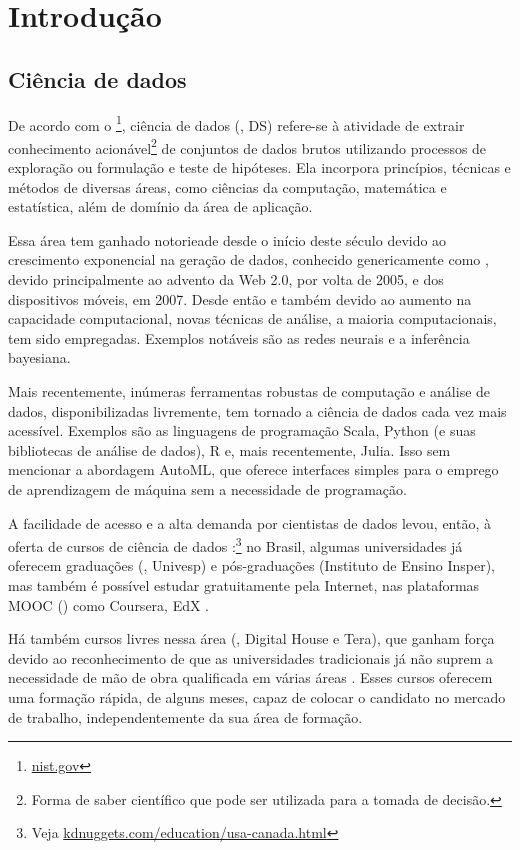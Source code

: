\section{Introdução}
\subsection{Ciência de dados}

De acordo com o \footnote{\url{nist.gov}}, ciência de dados (, DS) refere-se à atividade de extrair conhecimento acionável\footnote{Forma de saber científico que pode ser utilizada para a tomada de decisão.} de conjuntos de dados brutos utilizando processos de exploração ou formulação e teste de hipóteses.
Ela incorpora princípios, técnicas e métodos de diversas áreas, como ciências da computação, matemática e estatística, além de domínio da área de aplicação.

Essa área tem ganhado notorieade desde o início deste século devido ao crescimento exponencial na geração de dados, conhecido genericamente como , devido principalmente ao advento da Web 2.0, por volta de 2005, e dos dispositivos móveis, em 2007.
Desde então e também devido ao aumento na capacidade computacional, novas técnicas de análise, a maioria computacionais, tem sido empregadas.
Exemplos notáveis são as redes neurais e a inferência bayesiana.

Mais recentemente, inúmeras ferramentas robustas de computação e análise de dados, disponibilizadas livremente, tem tornado a ciência de dados cada vez mais acessível.
Exemplos são as linguagens de programação Scala, Python (e suas bibliotecas de análise de dados), R e, mais recentemente, Julia.
Isso sem mencionar a abordagem AutoML, que oferece interfaces simples para o emprego de aprendizagem de máquina sem a necessidade de programação.

A facilidade de acesso e a alta demanda por cientistas de dados levou, então, à oferta de cursos de ciência de dados \cite{Hassan2019}:\footnote{Veja \url{kdnuggets.com/education/usa-canada.html}} no Brasil, algumas universidades já oferecem graduações (\eg, Univesp) e pós-graduações (Instituto de Ensino Insper), mas também é possível estudar gratuitamente pela Internet, nas plataformas MOOC () como Coursera, EdX \etc.

Há também cursos livres nessa área (\eg, Digital House e Tera), que ganham força devido ao reconhecimento de que as universidades tradicionais já não suprem a necessidade de mão de obra qualificada em várias áreas \cite{Zulauf2006}.
Esses cursos oferecem uma formação rápida, de alguns meses, capaz de colocar o candidato no mercado de trabalho, independentemente da sua área de formação.

